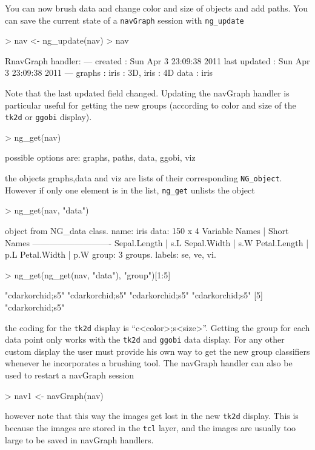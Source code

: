 \documentclass[12pt,oneside,titlepage,letter]{article}
\begin{document}
You can now brush data and change color and size of objects and add paths. You can save the current state of a \texttt{navGraph} session with \texttt{ng\_update}
\begin{Schunk}
\begin{Sinput}
> nav <- ng_update(nav)
> nav
\end{Sinput}
\begin{Soutput}
RnavGraph handler:
---
created       : Sun Apr  3 23:09:38 2011 
last updated  : Sun Apr  3 23:09:38 2011 
---
graphs        : iris : 3D, iris : 4D 
data          : iris 
\end{Soutput}
\end{Schunk}
Note that the last updated field changed. Updating the navGraph handler is particular useful for getting the new groups (according to color and size of the \texttt{tk2d} or \texttt{ggobi} display).
\begin{Schunk}
\begin{Sinput}
> ng_get(nav)
\end{Sinput}
\begin{Soutput}
possible options are: graphs, paths, data, ggobi, viz
\end{Soutput}
\end{Schunk}
the objects graphs,data and viz are lists of their corresponding \texttt{NG\_object}. However if only one element is in the list, \texttt{ng\_get} unlists the object
\begin{Schunk}
\begin{Sinput}
> ng_get(nav, "data")
\end{Sinput}
\begin{Soutput}
object from NG_data class.
  name: iris 
  data: 150 x 4 
    Variable Names | Short Names
    ----------------------------
    Sepal.Length   | s.L
    Sepal.Width    | s.W
    Petal.Length   | p.L
    Petal.Width    | p.W
  group:  3 groups.
  labels: se, ve, vi. 
\end{Soutput}
\begin{Sinput}
> ng_get(ng_get(nav, "data"), "group")[1:5]
\end{Sinput}
\begin{Soutput}
[1] "cdarkorchid;s5" "cdarkorchid;s5" "cdarkorchid;s5" "cdarkorchid;s5"
[5] "cdarkorchid;s5"
\end{Soutput}
\end{Schunk}
the coding for the \texttt{tk2d} display is ``c<color>;s<size>''. Getting the group for each data point only works with the \texttt{tk2d} and \texttt{ggobi} data display. For any other custom display the user must provide his own way to get the new group classifiers whenever he incorporates a brushing tool. The navGraph handler can also be used to restart a navGraph session
\begin{Schunk}
\begin{Sinput}
> nav1 <- navGraph(nav)
\end{Sinput}
\end{Schunk}
however note that this way the images get lost in the new \texttt{tk2d} display. This is because the images are stored in the \texttt{tcl} layer, and the images are usually too large to be saved in navGraph handlers.\\
\end{document}
